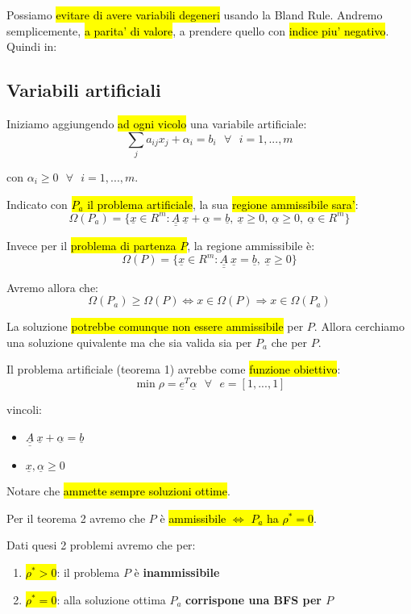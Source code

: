 Possiamo \hl{evitare di avere variabili degeneri} usando la Bland Rule. Andremo semplicemente, \hl{a parita' di valore}, a prendere quello con \hl{indice piu' negativo}. Quindi in:


\subsection{Variabili artificiali}

Iniziamo aggiungendo \hl{ad ogni vicolo} una variabile artificiale:
$$\sum_j a_{ij}x_j + \alpha_i = b_i\ \ \ \forall\ \ \ i = 1, ..., m$$

con $\alpha_i \geq 0\ \ \ \forall\ \ \ i = 1, ..., m$.

Indicato con \hl{$P_a$ il problema artificiale}, la sua \hl{regione ammissibile sara'}:
$$\Omega(P_a) = \{\underline{x} \in R^m : \underline{\underline{A}}\ \underline{x} + \underline{\alpha} = \underline{b},\ \underline{x} \geq 0,\ \underline{\alpha} \geq 0,\ \underline{\alpha} \in R^m\}$$

Invece per il \hl{problema di partenza $P$}, la regione ammissibile è:
$$\Omega(P) = \{\underline{x} \in R^m : \underline{\underline{A}}\ \underline{x} = \underline{b},\ \underline{x} \geq 0\}$$

Avremo allora che:
$$\Omega(P_a) \geq \Omega(P) \Leftrightarrow x \in \Omega(P) \Rightarrow x \in \Omega(P_a)$$

La soluzione \hl{potrebbe comunque non essere ammissibile} per $P$. Allora cerchiamo una soluzione quivalente ma che sia valida sia per $P_a$ che per $P$.

Il problema artificiale (teorema 1) avrebbe come \hl{funzione obiettivo}:
$$\min \rho = \underline{e}^T \underline{\alpha}\ \ \ \forall\ \ \ e = [1, ..., 1]$$

vincoli:

\begin{itemize}
	\item $\underline{\underline{A}}\ \underline{x} + \underline{\alpha} = \underline{b}$
	\item $\underline{x}, \underline{\alpha} \geq 0$
\end{itemize}

Notare che \hl{ammette sempre soluzioni ottime}.

Per il teorema 2 avremo che $P$ è \hl{ammissibile $\Leftrightarrow$ $P_a$ ha $\rho^* = 0$}.

Dati quesi 2 problemi avremo che per:

\begin{enumerate}
	\item \hl{$\rho^* > 0$}: il problema $P$ è \textbf{inammissibile}
	\item \hl{$\rho^* = 0$}: alla soluzione ottima $P_a$ \textbf{corrispone una BFS per $P$}
\end{enumerate}


